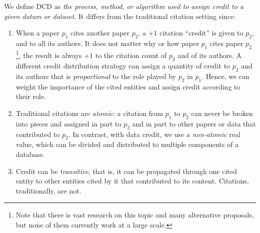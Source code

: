 We define DCD as {\em the process, method, or algorithm used to assign credit to a given datum or dataset}. It differs from the traditional citation setting since: 
\begin{enumerate}
    \item \textcolor{correction}{When a paper $p_1$ cites another paper $p_2$, a $+1$ citation ``credit'' is given to $p_2$, and to all its authors. It does not matter why or how paper $p_1$ cites paper $p_2$\footnote{Note that there is vast research on this topic and many alternative proposals, but none of them currently work at a large scale.}, the result is always $+1$ to the citation count of $p_2$ and of its authors. A different credit distribution strategy can assign a quantity of credit to $p_2$ and its authors that is \emph{proportional} to the role played by $p_2$ in $p_1$. Hence, we can weight the importance of the cited entities and assign credit according to their role.}
    \item \textcolor{correction}{Traditional citations are \emph{atomic}: a citation from $p_1$ to $p_2$ can never be broken into pieces and assigned in part to $p_2$ and in part to other papers or data that contributed to $p_2$. 
	In contrast, with data credit, we use a \emph{non-atomic} real value, which can be divided and distributed to multiple components of a database.} 
	\item Credit can be \emph{transitive}, that is, it can be propagated through one cited entity to other entities cited by it that contributed to its content. Citations, traditionally, are not. 
\end{enumerate}



